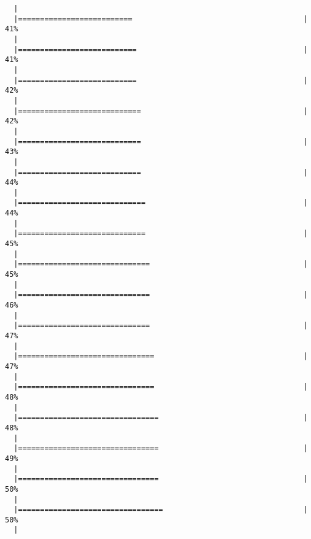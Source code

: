 \begin{knitrout}
\begin{kframe}
\begin{verbatim}
  |                                                                       
  |==========================                                       |  41%
  |                                                                       
  |===========================                                      |  41%
  |                                                                       
  |===========================                                      |  42%
  |                                                                       
  |============================                                     |  42%
  |                                                                       
  |============================                                     |  43%
  |                                                                       
  |============================                                     |  44%
  |                                                                       
  |=============================                                    |  44%
  |                                                                       
  |=============================                                    |  45%
  |                                                                       
  |==============================                                   |  45%
  |                                                                       
  |==============================                                   |  46%
  |                                                                       
  |==============================                                   |  47%
  |                                                                       
  |===============================                                  |  47%
  |                                                                       
  |===============================                                  |  48%
  |                                                                       
  |================================                                 |  48%
  |                                                                       
  |================================                                 |  49%
  |                                                                       
  |================================                                 |  50%
  |                                                                       
  |=================================                                |  50%
  |                                                                       

\end{verbatim}
\end{kframe}
\end{knitrout}
